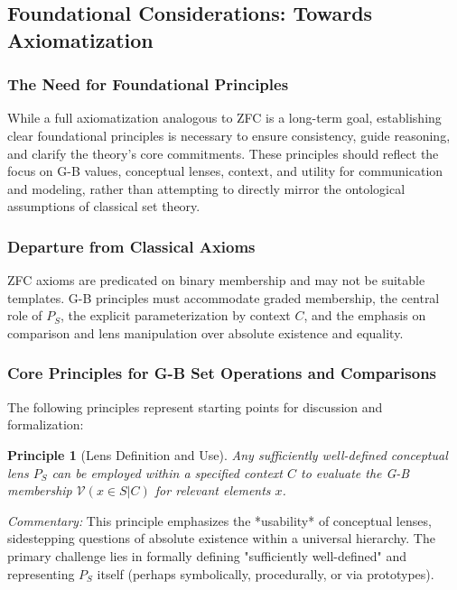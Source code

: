 \documentclass[11pt]{article}
\newcommand{\gbval}[1]{\mathcal{V}(#1)}         %
\newcommand{\pset}[1]{P_{#1}}                   %
\theoremstyle{definition}
\theoremstyle{plain}
\newtheorem{principle}{Principle}[section] %
\begin{document}
\subsection{Foundational Considerations: Towards Axiomatization} \label{sec:axiomatization}

\subsubsection{The Need for Foundational Principles}
While a full axiomatization analogous to ZFC is a long-term goal, establishing clear foundational principles is necessary to ensure consistency, guide reasoning, and clarify the theory's core commitments. These principles should reflect the focus on G-B values, conceptual lenses, context, and utility for communication and modeling, rather than attempting to directly mirror the ontological assumptions of classical set theory.

\subsubsection{Departure from Classical Axioms}
ZFC axioms are predicated on binary membership and may not be suitable templates. G-B principles must accommodate graded membership, the central role of $\pset{S}$, the explicit parameterization by context $C$, and the emphasis on comparison and lens manipulation over absolute existence and equality.

\subsubsection{Core Principles for G-B Set Operations and Comparisons}
The following principles represent starting points for discussion and formalization:

\begin{principle}[Lens Definition and Use]
Any sufficiently well-defined conceptual lens $\pset{S}$ can be employed within a specified context $C$ to evaluate the G-B membership $\gbval{x \in S | C}$ for relevant elements $x$.
\end{principle}
\textit{Commentary:} This principle emphasizes the *usability* of conceptual lenses, sidestepping questions of absolute existence within a universal hierarchy. The primary challenge lies in formally defining "sufficiently well-defined" and representing $\pset{S}$ itself (perhaps symbolically, procedurally, or via prototypes).
\end{document}
